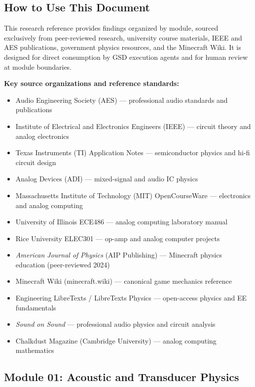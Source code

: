 \documentclass[11pt,letterpaper]{article}
\begin{document}
\subsection{How to Use This Document}

This research reference provides findings organized by module, sourced exclusively from peer-reviewed research, university course materials, IEEE and AES publications, government physics resources, and the Minecraft Wiki. It is designed for direct consumption by GSD execution agents and for human review at module boundaries.

\textbf{Key source organizations and reference standards:}
\begin{itemize}[leftmargin=2em]
  \item Audio Engineering Society (AES) --- professional audio standards and publications
  \item Institute of Electrical and Electronics Engineers (IEEE) --- circuit theory and analog electronics
  \item Texas Instruments (TI) Application Notes --- semiconductor physics and hi-fi circuit design
  \item Analog Devices (ADI) --- mixed-signal and audio IC physics
  \item Massachusetts Institute of Technology (MIT) OpenCourseWare --- electronics and analog computing
  \item University of Illinois ECE486 --- analog computing laboratory manual
  \item Rice University ELEC301 --- op-amp and analog computer projects
  \item \textit{American Journal of Physics} (AIP Publishing) --- Minecraft physics education (peer-reviewed 2024)
  \item Minecraft Wiki (minecraft.wiki) --- canonical game mechanics reference
  \item Engineering LibreTexts / LibreTexts Physics --- open-access physics and EE fundamentals
  \item \textit{Sound on Sound} --- professional audio physics and circuit analysis
  \item Chalkdust Magazine (Cambridge University) --- analog computing mathematics
\end{itemize}

\subsection{Module 01: Acoustic and Transducer Physics}
\end{document}
